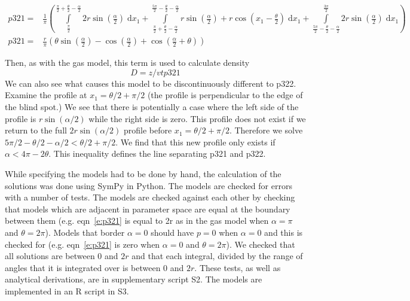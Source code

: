 \documentclass[a4paper,10pt,reqno,oneside]{amsart}
\begin{document}
\begin{align}
    p321 =&\frac{1}{\pi} \left(\int\limits_{\frac{\pi}{2}}^{\frac{\pi}{2} + \frac{\theta}{2} - \frac{\alpha}{2}}2 r \sin{\left (\frac{\alpha}{2} \right )}\;\mathrm{d}x_1+\int\limits_{\frac{\pi}{2} + \frac{\theta}{2} - \frac{\alpha}{2}}^{\frac{5 \pi}{2} - \frac{\theta}{2} - \frac{\alpha}{2}}r \sin{\left (\frac{\alpha}{2} \right )} + r \cos{\left (x_1 - \frac{\theta}{2} \right )}\;\mathrm{d}x_1+\int\limits_{\frac{5 \pi}{2} - \frac{\theta}{2} - \frac{\alpha}{2}}^{\frac{3 \pi}{2}}2 r \sin{\left (\frac{\alpha}{2} \right )}\;\mathrm{d}x_1\right)\\
    p321 =& \frac{r}{\pi} \left(\theta \sin{\left (\frac{\alpha}{2} \right )} - \cos{\left (\frac{\alpha}{2} \right )} + \cos{\left (\frac{\alpha}{2} + \theta \right )}\right) \label{e:p321}
\end{align}

Then, as with the gas model, this term is used to calculate density
\begin{equation}
\label{e:gas}
D = z/vtp321
\end{equation}
We can also see what causes this model to be discontinuously different to p322. Examine the profile at $x_1 = 	\theta/2 + \pi/2$ (the profile is perpendicular to the edge of the blind spot.) We see that there is potentially a case where the left side of the profile is $r\sin( \alpha/2)$ while the right side is zero. This profile does not exist if we return to the full $2r\sin( \alpha/2)$ profile before $x_1  = \theta/2 + \pi/2$. Therefore we solve $5\pi/2 - \theta/2 - \alpha/2 <  \theta/2 + \pi/2$. We find that this new profile only exists if $ \alpha < 4\pi - 2 \theta$. This inequality defines the line separating p321 and p322.

While specifying the models had to be done by hand, the calculation of the solutions was done using SymPy \citep{sympy} in Python. The models are checked for errors with a number of tests. The models are checked against each other by checking that models which are adjacent in parameter space are equal at the boundary between them (e.g. eqn~\ref{e:p321} is equal to 2r as in the gas model when $\alpha=\pi$ and $\theta=2\pi$). Models that border $ \alpha = 0$ should have $p = 0$ when $ \alpha = 0$ and this is checked for (e.g. eqn~\ref{e:p321} is zero when $\alpha=0$ and $\theta=2\pi$). We checked that all solutions are between 0 and $2r$ and that each integral, divided by the range of angles that it is integrated over is between 0 and $2r$. These tests, as well as analytical derivations, are in supplementary script S2. The models are implemented in an R script in S3. 
\end{document}
